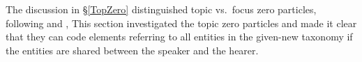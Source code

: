 The discussion in \S \ref{TopZero} distinguished topic vs.~focus zero particles,
following  and ,
This section investigated the topic zero particles and made it clear
that they can code elements referring to all entities in the given-new taxonomy
if the entities are shared between the speaker and the hearer.


%
%
%
